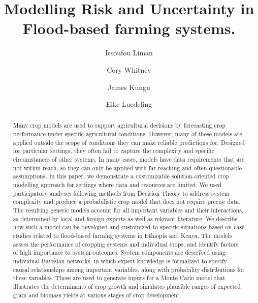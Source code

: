 \documentclass[]{elsarticle} %
\begin{document}
\begin{frontmatter}

  \title{Modelling Risk and Uncertainty in Flood-based farming systems.}
    \author[ICRAF,KU]{Issoufou Liman}
    \author[ICRAF,ZEF]{Cory Whitney}
    \author[KU]{James Kungu}
    \author[INRES]{Eike Luedeling}
      \address[KU]{Kenyatta University, Department of Environmental Sciences}
    \address[ICRAF]{World Agroforestry Centre (ICRAF), United Nations Avenue, Gigiri, P. O. Box 30677-00100, Nairobi, Kenya}
    \address[INRES]{University of Bonn, Department of Horticultural Sciences, Auf dem Hügel 6, D-53121, Bonn, Germany}
    \address[ZEF]{Center for Development research (ZEF), University of Bonn, Genscherallee 3, D-53113, Bonn, Germany}
    
  \begin{abstract}
  Many crop models are used to support agricultural decisions by forecasting crop performance under specific agricultural conditions. However, many of these models are applied outside the scope of conditions they can make reliable predictions for. Designed for particular settings, they often fail to capture the complexity and specific circumstances of other systems. In many cases, models have data requirements that are not within reach, so they can only be applied with far-reaching and often questionable assumptions. In this paper, we demonstrate a customizable solution-oriented crop modelling approach for settings where data and resources are limited. We used participatory analyses following methods from Decision Theory to address system complexity and produce a probabilistic crop model that does not require precise data. The resulting generic models account for all important variables and their interactions, as determined by local and foreign experts as well as relevant literature. We describe how such a model can be developed and customized to specific situations based on case studies related to flood-based farming systems in Ethiopia and Kenya. The models assess the performance of cropping systems and individual crops, and identify factors of high importance to system outcomes. System components are described using individual Bayesian networks, in which expert knowledge is formalized to specify causal relationships among important variables, along with probability distributions for these variables. These are used to generate inputs for a Monte Carlo model that illustrates the determinants of crop growth and simulates plausible ranges of expected grain and biomass yields at various stages of crop development.
  \end{abstract}
  
 \end{frontmatter}
\end{document}
